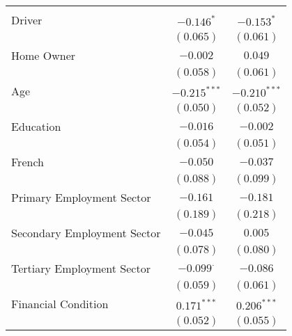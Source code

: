 \begin{center}
\begin{tiny}
\begin{longtable}{l@{} c@{} c@{}}
                                                         &                  &                  \\
\quad Driver                                             & $-0.146^{*}$     & $-0.153^{*}$     \\
                                                         & $(0.065)$        & $(0.061)$        \\
\quad Home Owner                                         & $-0.002$         & $0.049$          \\
                                                         & $(0.058)$        & $(0.061)$        \\
\quad Age                                                & $-0.215^{***}$   & $-0.210^{***}$   \\
                                                         & $(0.050)$        & $(0.052)$        \\
\quad Education                                          & $-0.016$         & $-0.002$         \\
                                                         & $(0.054)$        & $(0.051)$        \\
\quad French                                             & $-0.050$         & $-0.037$         \\
                                                         & $(0.088)$        & $(0.099)$        \\
\quad Primary Employment Sector                          & $-0.161$         & $-0.181$         \\
                                                         & $(0.189)$        & $(0.218)$        \\
\quad Secondary Employment Sector                        & $-0.045$         & $0.005$          \\
                                                         & $(0.078)$        & $(0.080)$        \\
\quad Tertiary Employment Sector                         & $-0.099^{\cdot}$ & $-0.086$         \\
                                                         & $(0.059)$        & $(0.061)$        \\
\quad Financial Condition                                & $0.171^{***}$    & $0.206^{***}$    \\
                                                         & $(0.052)$        & $(0.055)$        \\

\end{longtable}
\end{tiny}
\end{center}
